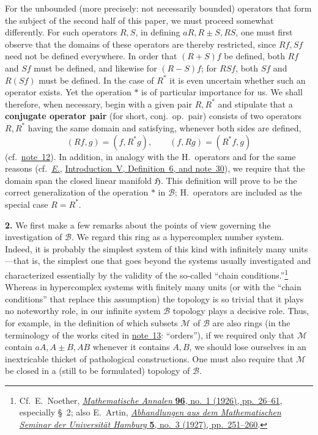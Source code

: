\documentclass[
  paper=b5,
  twoside=true,
  fontsize=13pt,
  headings=normal,
  bookmarkpackage=false
]{scrartcl}
\theoremstyle{definition}
\newcommand{\NoteRef}[1]{\hyperref[fn:#1]{note~#1}}
\newcommand{\Eref}{\hyperref[fn:E-paper]{\emph{E.}}}
\newcommand{\ErefText}[1]{\href{https://doi.org/10.1007/BF01782338}{#1}}
\begin{document}
For the unbounded (more precisely: not necessarily bounded) operators that
form the subject of the second half of this paper, we must proceed somewhat
differently. For such operators $R,S$, in defining $aR,R\pm S,RS$, one
must first observe that the domains of these operators are thereby
restricted, since $Rf,Sf$ need not be defined everywhere. In order that
$(R+S)f$ be defined, both $Rf$ and $Sf$ must be defined, and likewise for
$(R-S)f$; for $RSf$, both $Sf$ and $R(Sf)$ must be defined. In the case of
$R^*$ it is even uncertain whether such an operator exists. Yet the
operation $*$ is of particular importance for us. We shall therefore, when
necessary, begin with a given pair $R,R^*$ and stipulate that a
\textbf{conjugate operator pair} (for short, conj.\ op.\ pair) consists of two
operators $R,R^*$ having the same domain and satisfying, whenever both
sides are defined,
\[
  (Rf,g)=(f,R^*g),\qquad (f,Rg)=(R^*f,g)
\]
(cf.\ \NoteRef{12}). In addition, in analogy with the H.\ operators and for the
same reasons (cf.\ \Eref, \ErefText{Introduction~V, Definition~6, and note~30}), we
require that the domain span the closed linear manifold $\mathfrak H$.
This definition will prove to be
the correct generalization of the operation $*$ in $\mathcal B$; H.\
operators are included as the special case $R=R^*$.

\medskip
{}
\noindent\textbf{2.}\label{intro:2}
We first make a few remarks about the points of view governing the
investigation of $\mathcal B$. We regard this ring as a hypercomplex number
system. Indeed, it is probably the simplest system of this kind with
infinitely many units---that is, the simplest one that goes beyond the
systems usually investigated and characterized essentially by the validity
of the so-called ``chain conditions.''\footnote{\label{fn:13}Cf.\ E.~Noether,
\href{https://doi.org/10.1007/BF01209152}{\emph{Mathematische Annalen} \textbf{96}, no.~1 (1926), pp.~26--61},
especially \S~2; also E.~Artin, \href{https://doi.org/10.1007/BF02952526}{\emph{Abhandlungen aus dem Mathematischen
Seminar der Universit\"at Hamburg} \textbf{5}, no.~3 (1927), pp.~251--260}.}
Whereas in hypercomplex systems with finitely many units (or with the
``chain conditions'' that replace this assumption) the topology is so
trivial that it plays no noteworthy role, in our infinite system
$\mathcal B$ topology plays a decisive role. Thus, for example, in the
definition of which subsets $\mathcal M$ of $\mathcal B$ are also rings
(in the terminology of the works cited in \NoteRef{13}: ``orders''), if we
required only that $\mathcal M$ contain $aA,A\pm B,AB$ whenever it contains
$A,B$, we should lose ourselves in an inextricable thicket of pathological
constructions. One must also require that $\mathcal M$ be closed in a
(still to be formulated) topology of $\mathcal B$.
\end{document}
